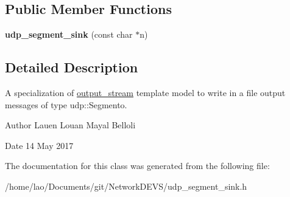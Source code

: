\subsection*{Public Member Functions}
\begin{DoxyCompactItemize}
\item 
{\bfseries udp\+\_\+segment\+\_\+sink} (const char $\ast$n)\hypertarget{classudp__segment__sink_a61bd73218f0cb2ea949aada272f37fde}{}\label{classudp__segment__sink_a61bd73218f0cb2ea949aada272f37fde}

\end{DoxyCompactItemize}


\subsection{Detailed Description}
A specialization of \hyperlink{classoutput__stream}{output\+\_\+stream} template model to write in a file output messages of type udp\+::\+Segmento. 

\begin{DoxyAuthor}{Author}
Lauen Louan Mayal Belloli 
\end{DoxyAuthor}
\begin{DoxyDate}{Date}
14 May 2017 
\end{DoxyDate}


The documentation for this class was generated from the following file\+:\begin{DoxyCompactItemize}
\item 
/home/lao/\+Documents/git/\+Network\+D\+E\+V\+S/udp\+\_\+segment\+\_\+sink.\+h\end{DoxyCompactItemize}
